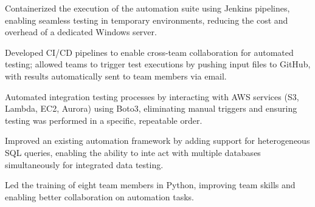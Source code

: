 {
\item
}

{
\item Containerized the execution of the automation suite using Jenkins pipelines, enabling seamless testing in temporary environments, reducing the cost and overhead of a dedicated Windows server.
\item Developed CI/CD pipelines to enable cross-team collaboration for automated testing; allowed teams to trigger test executions by pushing input files to GitHub, with results automatically sent to team members via email.
\item Automated integration testing processes by interacting with AWS services (S3, Lambda, EC2, Aurora) using Boto3, eliminating manual triggers and ensuring testing was performed in a specific, repeatable order.
\item Improved an existing automation framework by adding support for heterogeneous SQL queries, enabling the ability to inte act with multiple databases simultaneously for integrated data testing.
\item Led the training of eight team members in Python, improving team skills and enabling better collaboration on automation tasks.
}
